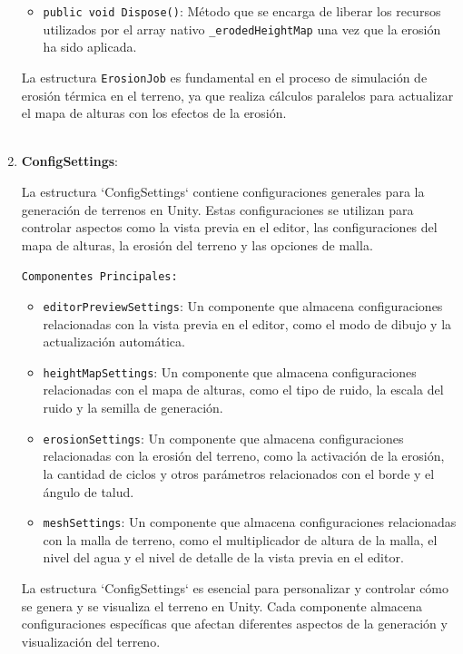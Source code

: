 \begin{enumerate}
\begin{itemize}
        \item \texttt{public void Dispose()}: Método que se encarga de liberar los recursos utilizados por el array nativo \texttt{\_erodedHeightMap} una vez que la erosión ha sido aplicada.

    \end{itemize}

    La estructura \texttt{ErosionJob} es fundamental en el proceso de simulación de erosión térmica en el terreno, ya que realiza cálculos paralelos para actualizar el mapa de alturas con los efectos de la erosión.\\
    \\
    \item \textbf{ConfigSettings}:

    La estructura `ConfigSettings` contiene configuraciones generales para la generación de terrenos en Unity. Estas configuraciones se utilizan para controlar aspectos como la vista previa en el editor, las configuraciones del mapa de alturas, la erosión del terreno y las opciones de malla.

    \texttt{Componentes Principales:}

    \begin{itemize}
        \item \texttt{editorPreviewSettings}: Un componente que almacena configuraciones relacionadas con la vista previa en el editor, como el modo de dibujo y la actualización automática.
        
        \item \texttt{heightMapSettings}: Un componente que almacena configuraciones relacionadas con el mapa de alturas, como el tipo de ruido, la escala del ruido y la semilla de generación.
        
        \item \texttt{erosionSettings}: Un componente que almacena configuraciones relacionadas con la erosión del terreno, como la activación de la erosión, la cantidad de ciclos y otros parámetros relacionados con el borde y el ángulo de talud.
        
        \item \texttt{meshSettings}: Un componente que almacena configuraciones relacionadas con la malla de terreno, como el multiplicador de altura de la malla, el nivel del agua y el nivel de detalle de la vista previa en el editor.
    \end{itemize}

    La estructura `ConfigSettings` es esencial para personalizar y controlar cómo se genera y se visualiza el terreno en Unity. Cada componente almacena configuraciones específicas que afectan diferentes aspectos de la generación y visualización del terreno.
\end{enumerate}

